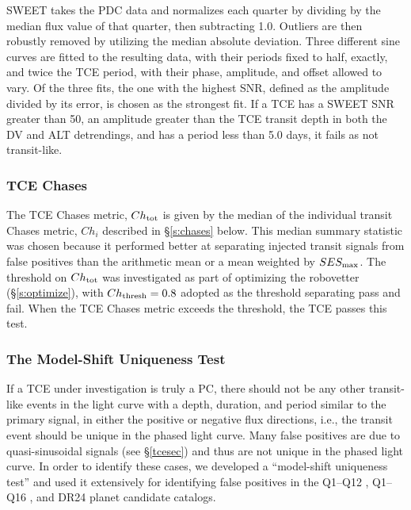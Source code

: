 SWEET takes the PDC data and normalizes each quarter by dividing by the median flux value of that quarter, then subtracting 1.0. Outliers are then robustly removed by utilizing the median absolute deviation. Three different sine curves are fitted to the resulting data, with their periods fixed to half, exactly, and twice the TCE period, with their phase, amplitude, and offset allowed to vary. Of the three fits, the one with the highest SNR, defined as the amplitude divided by its error, is chosen as the strongest fit. If a TCE has a SWEET SNR greater than 50, an amplitude greater than the TCE transit depth in both the DV and ALT detrendings, and has a period less than 5.0 days, it fails as not transit-like.




\subsubsection{TCE Chases}
\label{s:tcechases}
The TCE Chases metric, $Ch_{\rm tot}$ is given by the median of the individual transit Chases metric, $Ch_{i}$ described in \S\ref{s:chases} below.  This median summary statistic was chosen because it performed better at separating injected transit signals from false positives than the arithmetic mean or a mean weighted by $SES_{\rm max}$. The threshold on $Ch_{\rm tot}$ was investigated as part of optimizing the robovetter (\S\ref{s:optimize}), with $Ch_{\rm thresh}=0.8$ adopted as the threshold separating pass and fail. When the TCE Chases metric exceeds the threshold, the TCE passes this test.


\subsubsection{The Model-Shift Uniqueness Test}
\label{s:ms}

If a TCE under investigation is truly a PC, there should not be any other transit-like events in the light curve with a depth, duration, and period similar to the primary signal, in either the positive or negative flux directions, i.e., the transit event should be unique in the phased light curve. Many false positives are due to quasi-sinusoidal signals (see \S\ref{tcesec}) and thus are not unique in the phased light curve. In order to identify these cases, we developed a ``model-shift uniqueness test'' and used it extensively for identifying false positives in the Q1--Q12 \citep{Rowe2015a}, Q1--Q16 \citep{Mullally2015cat}, and DR24 \citep{Coughlin2016} planet candidate catalogs.

